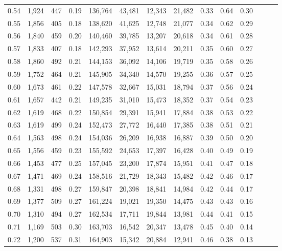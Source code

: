 \begin{tabular}{rrrrrrrrrrrrrr}
0.54 &  1,924 &  447 &  0.19 &  136,764 &   43,481 &  12,343 &  21,482 &  0.33 &  0.64 &      0.30 \\
0.55 &  1,856 &  405 &  0.18 &  138,620 &   41,625 &  12,748 &  21,077 &  0.34 &  0.62 &      0.29 \\
0.56 &  1,840 &  459 &  0.20 &  140,460 &   39,785 &  13,207 &  20,618 &  0.34 &  0.61 &      0.28 \\
0.57 &  1,833 &  407 &  0.18 &  142,293 &   37,952 &  13,614 &  20,211 &  0.35 &  0.60 &      0.27 \\
0.58 &  1,860 &  492 &  0.21 &  144,153 &   36,092 &  14,106 &  19,719 &  0.35 &  0.58 &      0.26 \\
0.59 &  1,752 &  464 &  0.21 &  145,905 &   34,340 &  14,570 &  19,255 &  0.36 &  0.57 &      0.25 \\
0.60 &  1,673 &  461 &  0.22 &  147,578 &   32,667 &  15,031 &  18,794 &  0.37 &  0.56 &      0.24 \\
0.61 &  1,657 &  442 &  0.21 &  149,235 &   31,010 &  15,473 &  18,352 &  0.37 &  0.54 &      0.23 \\
0.62 &  1,619 &  468 &  0.22 &  150,854 &   29,391 &  15,941 &  17,884 &  0.38 &  0.53 &      0.22 \\
0.63 &  1,619 &  499 &  0.24 &  152,473 &   27,772 &  16,440 &  17,385 &  0.38 &  0.51 &      0.21 \\
0.64 &  1,563 &  498 &  0.24 &  154,036 &   26,209 &  16,938 &  16,887 &  0.39 &  0.50 &      0.20 \\
0.65 &  1,556 &  459 &  0.23 &  155,592 &   24,653 &  17,397 &  16,428 &  0.40 &  0.49 &      0.19 \\
0.66 &  1,453 &  477 &  0.25 &  157,045 &   23,200 &  17,874 &  15,951 &  0.41 &  0.47 &      0.18 \\
0.67 &  1,471 &  469 &  0.24 &  158,516 &   21,729 &  18,343 &  15,482 &  0.42 &  0.46 &      0.17 \\
0.68 &  1,331 &  498 &  0.27 &  159,847 &   20,398 &  18,841 &  14,984 &  0.42 &  0.44 &      0.17 \\
0.69 &  1,377 &  509 &  0.27 &  161,224 &   19,021 &  19,350 &  14,475 &  0.43 &  0.43 &      0.16 \\
0.70 &  1,310 &  494 &  0.27 &  162,534 &   17,711 &  19,844 &  13,981 &  0.44 &  0.41 &      0.15 \\
0.71 &  1,169 &  503 &  0.30 &  163,703 &   16,542 &  20,347 &  13,478 &  0.45 &  0.40 &      0.14 \\
0.72 &  1,200 &  537 &  0.31 &  164,903 &   15,342 &  20,884 &  12,941 &  0.46 &  0.38 &      0.13 \\

\end{tabular}
